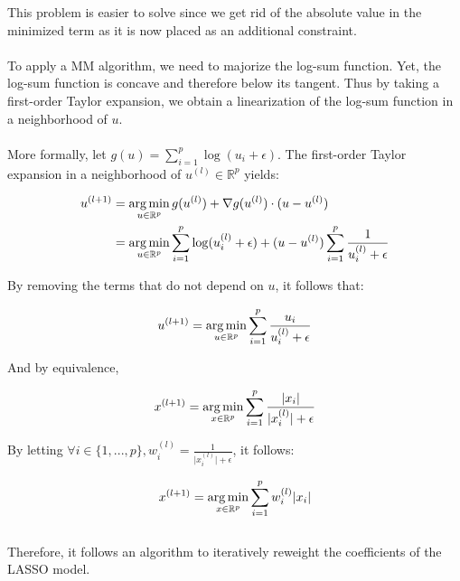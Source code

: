 \documentclass[a4paper,10pt]{article}
\theoremstyle{definition}
\begin{document}
This problem is easier to solve since we get rid of the absolute value in the minimized term as it is now placed as an additional constraint.
\\
\\
To apply a MM algorithm, we need to majorize the log-sum function. Yet, the log-sum function is concave and therefore below its tangent. Thus by taking a first-order Taylor expansion, we obtain a linearization of
the log-sum function in a neighborhood of $u$.
\\
\\
More formally, let $g(u) = \sum_{i=1}^p \log(u_i + \epsilon)$. The first-order Taylor expansion in a neighborhood of $u^{(l)} \in \mathbb{R}^p$ yields:

\begin{align*}
    u^{(l+1)} &= \operatorname*{arg\,min}_{u \in \mathbb{R}^p} g(u^{(l)}) + \nabla g(u^{(l)})\cdot (u - u^{(l)}) \\
              &= \operatorname*{arg\,min}_{u \in \mathbb{R}^p} \sum_{i=1}^p \log( u_i^{(l)} + \epsilon) + (u - u^{(l)}) \sum_{i=1}^p \frac{1}{ u_i^{(l)}  + \epsilon}
\end{align*}

By removing the terms that do not depend on $u$, it follows that:

\begin{equation*}
    u^{(l+1)} = \operatorname*{arg\,min}_{u \in \mathbb{R}^p} \sum_{i=1}^p \frac{u_i}{ u_i^{(l)} + \epsilon}
\end{equation*}

And by equivalence, 

\begin{equation*}
    x^{(l+1)} = \operatorname*{arg\,min}_{x \in \mathbb{R}^p} \sum_{i=1}^p \frac{\lvert x_i \rvert}{\lvert x_i^{(l)} \rvert + \epsilon}
\end{equation*}

By letting $\forall i \in \{1, ..., p\}, w_i^{(l)} = \frac{1}{\lvert x_i^{(l)}\rvert + \epsilon}$, it follows:

\begin{equation*}
    x^{(l+1)} = \operatorname*{arg\,min}_{x \in \mathbb{R}^p} \sum_{i=1}^p w_i^{(l)} \lvert x_i \rvert
\end{equation*}
\\
Therefore, it follows an algorithm to iteratively reweight the coefficients of the LASSO model.

\vskip 0.2in
\end{document}

